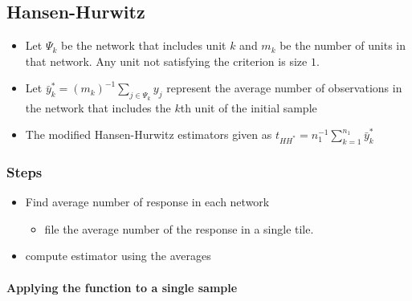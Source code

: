\documentclass[
]{article}
\providecommand{\tightlist}{%
  \setlength{\itemsep}{0pt}\setlength{\parskip}{0pt}}
\begin{document}
\subsection{Hansen-Hurwitz}\label{hansen-hurwitz}

\begin{itemize}
\tightlist
\item
  Let \(\Psi_k\) be the network that includes unit \(k\) and \(m_k\) be
  the number of units in that network. Any unit not satisfying the
  criterion is size \(1\).
\item
  Let \(\bar y_k^*=(m_k)^{-1}\sum_{j\in\Psi_k}y_j\) represent the
  average number of observations in the network that includes the
  \(k\)th unit of the initial sample
\item
  The modified Hansen-Hurwitz estimators given as
  \(t_{HH^*}=n_1^{-1}\sum^{n_1}_{k=1}\bar y_k^*\)
\end{itemize}

\subsubsection{Steps}\label{steps}

\begin{itemize}
\tightlist
\item
  Find average number of response in each network

  \begin{itemize}
  \tightlist
  \item
    file the average number of the response in a single tile.
  \end{itemize}
\item
  compute estimator using the averages
\end{itemize}

\paragraph{Applying the function to a single
sample}\label{applying-the-function-to-a-single-sample}
\end{document}
